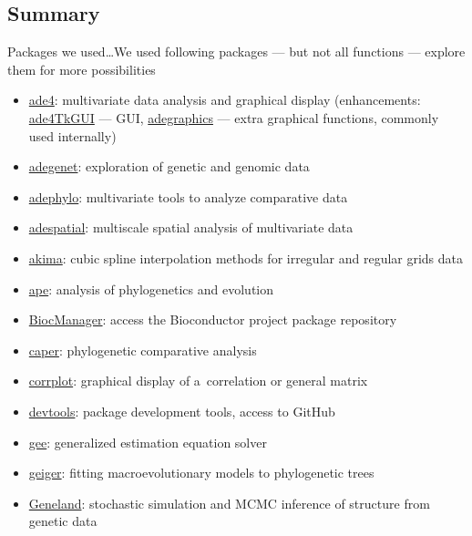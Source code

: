\documentclass[compress, ucs, xelatex, 11pt, xcolor=svgnames, aspectratio=169,
	hyperref={
		bookmarks=true,
		unicode=true,
		colorlinks=true,
		pdftitle={Molecular data in R},
		plainpages=false,
		pdfauthor={Vojtech Zeisek},
		pdfsubject={Course about phylogeny and evolution in R},
		pdfcreator={XeLaTeX},
		pdfkeywords={R, evolution, phylogeny, molecular data},
		linkcolor=Crimson, %
		anchorcolor=Magenta, %
		citecolor=Magenta, %
		filecolor=Magenta, %
		menucolor=Magenta, %
		urlcolor=DodgerBlue, %
		pdftex},
	url={hyphens, lowtilde} %
	]{beamer}
\begin{document}
\subsection{Summary}

\begin{frame}[allowframebreaks]{Packages we used\ldots}{We used following packages --- but not all functions --- explore them for more possibilities}
	\begin{itemize}
		\item \href{https://CRAN.R-project.org/package=ade4}{ade4}: multivariate data analysis and graphical display (enhancements: \href{https://CRAN.R-project.org/package=ade4TkGUI}{ade4TkGUI} --- GUI, \href{https://CRAN.R-project.org/package=adegraphics}{adegraphics} --- extra graphical functions, commonly used internally)
		\item \href{https://CRAN.R-project.org/package=adegenet}{adegenet}: exploration of genetic and genomic data
		\item \href{https://CRAN.R-project.org/package=adephylo}{adephylo}: multivariate tools to analyze comparative data
		\item \href{https://CRAN.R-project.org/package=adespatial}{adespatial}: multiscale spatial analysis of multivariate data
		\item \href{https://CRAN.R-project.org/package=akima}{akima}: cubic spline interpolation methods for irregular and regular grids data
		\item \href{https://CRAN.R-project.org/package=ape}{ape}: analysis of phylogenetics and evolution
		\item \href{https://CRAN.R-project.org/package=BiocManager}{BiocManager}: access the Bioconductor project package repository
		\item \href{https://CRAN.R-project.org/package=caper}{caper}: phylogenetic comparative analysis
		\item \href{https://CRAN.R-project.org/package=corrplot}{corrplot}: graphical display of a~correlation or general matrix
		\item \href{https://CRAN.R-project.org/package=devtools}{devtools}: package development tools, access to GitHub
		\item \href{https://CRAN.R-project.org/package=gee}{gee}: generalized estimation equation solver
		\item \href{https://CRAN.R-project.org/package=geiger}{geiger}: fitting macroevolutionary models to phylogenetic trees
		\item \href{https://i-pri.org/special/Biostatistics/Software/Geneland/}{Geneland}: stochastic simulation and MCMC inference of structure from genetic data

\end{itemize}
\end{frame}
\end{document}
